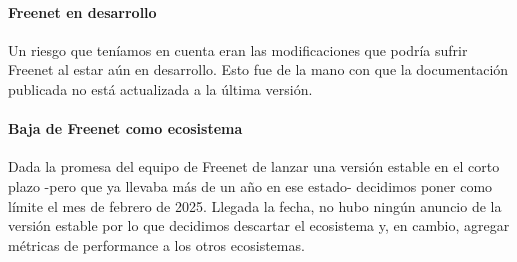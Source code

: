 \paragraph{Freenet en desarrollo}
Un riesgo que teníamos en cuenta eran las modificaciones que podría sufrir Freenet al estar aún en desarrollo. Esto fue de la mano con que la documentación publicada no está actualizada a la última versión.

\paragraph{Baja de Freenet como ecosistema}
Dada la promesa del equipo de Freenet de lanzar una versión estable en el corto plazo -pero que ya llevaba más de un año en ese estado- decidimos poner como límite el mes de febrero de 2025. Llegada la fecha, no hubo ningún anuncio de la versión estable por lo que decidimos descartar el ecosistema y, en cambio, agregar métricas de performance a los otros ecosistemas.